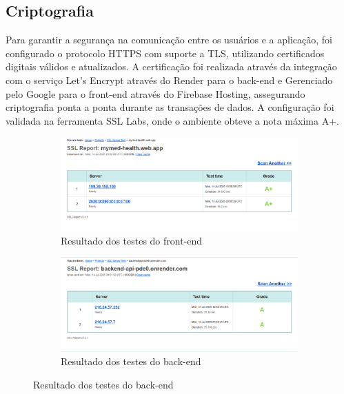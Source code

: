 \documentclass[
	article,			%
	12pt,				%
	oneside,			%
	a4paper,			%
    BIBLATEX,           %
	english,			%
	brazil,				%
	sumario=tradicional
	]{abntex2}
\begin{document}
\subsection{Criptografia}

Para garantir a segurança na comunicação entre os usuários e a aplicação, foi configurado o protocolo HTTPS com suporte a TLS, utilizando certificados digitais válidos e atualizados. A certificação foi realizada através da integração com o serviço Let's Encrypt através do Render para o back-end e Gerenciado pelo Google para o front-end através do Firebase Hosting, assegurando criptografia ponta a ponta durante as transações de dados. A configuração foi validada na ferramenta SSL Labs, onde o ambiente obteve a nota máxima A+.

\begin{figure}[h!]
    \caption{Resultados dos testes de criptografia.}
    \centering
    \begin{subfigure}[b]{0.45\textwidth}
        \centering
        \includegraphics[width=\textwidth]{figuras/certificacao_front.png}
        \caption{Resultado dos testes do front-end}
    \end{subfigure}
    \hfill
    \begin{subfigure}[b]{0.45\textwidth}
        \centering
        \includegraphics[width=\textwidth]{figuras/certificacao_back.png}
        \caption{Resultado dos testes do back-end}
    \end{subfigure}
    \label{fig:testes-criptografia}
\end{figure}
\end{document}

